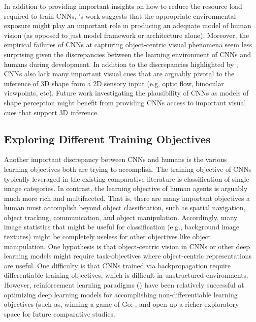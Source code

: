 \documentclass[12pt]{article}
\let\oldcite=\cite
\let\oldtextcite=\textcite
\renewcommand{\cite}[1]{\textcolor[rgb]{0, .121, .388}{\oldcite{#1}}}
\renewcommand{\textcite}[1]{\textcolor[rgb]{0, .121, .388}{\oldtextcite{#1}}}
\begin{document}
In addition to providing important insights on how to reduce the resource load required to train CNNs, \textcite{bambach2018toddler}'s work suggests that the appropriate environmental exposure might play an important role in producing an adequate model of human vision (as opposed to just model framework or architecture alone). Moreover, the empirical failures of CNNs at capturing object-centric visual phenomena seem less surprising given the discrepancies between the learning environment of CNNs and humans during development. In addition to the discrepancies highlighted by \textcite{bambach2018toddler}, CNNs also lack many important visual cues that are arguably pivotal to the inference of 3D shape from a 2D sensory input (e.g, optic flow, binocular viewpoints, etc). Future work investigating the plausibility of CNNs as models of shape perception might benefit from providing CNNs access to important visual cues that support 3D inference.

\subsection{Exploring Different Training Objectives}

Another important discrepancy between CNNs and humans is the various learning objectives both are trying to accomplish. The training objective of CNNs typically leveraged in the existing comparative literature is classification of single image categories. In contrast, the learning objective of human agents is arguably much more rich and multifaceted. That is, there are many important objectives a human must accomplish beyond object classification, such as spatial navigation, object tracking, communication, and object manipulation. Accordingly, many image statistics that might be useful for classification (e.g., background image textures) might be completely useless for other objectives like object manipulation. One hypothesis is that object-centric vision in CNNs or other deep learning models might require task-objectives where object-centric representations are useful. One difficulty is that CNNs trained via backpropagation require differentiable training objectives, which is difficult in unstructured environments. However, reinforcement learning paradigms (\cite{mnih2015human}) have been relatively successful at optimizing deep learning models for accomplishing non-differentiable learning objectives (such as, winning a game of Go; \cite{silver2016mastering}, and open up a richer exploratory space for future comparative studies.
\end{document}
